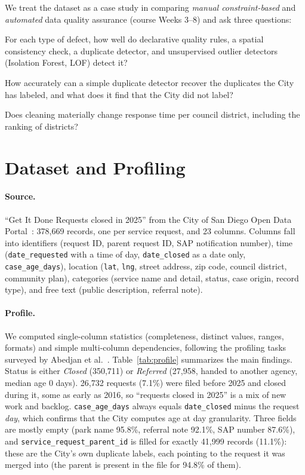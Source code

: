 \documentclass[11pt]{article}
\begin{document}
We treat the dataset as a case study in comparing \emph{manual constraint-based} and \emph{automated} data quality assurance (course Weeks 3--8) and ask three questions:

\begin{description}[leftmargin=1.2cm, style=nextline]
  \item[RQ1] For each type of defect, how well do declarative quality rules, a spatial consistency check, a duplicate detector, and unsupervised outlier detectors (Isolation Forest, LOF) detect it?
  \item[RQ2] How accurately can a simple duplicate detector recover the duplicates the City has labeled, and what does it find that the City did not label?
  \item[RQ3] Does cleaning materially change response time per council district, including the ranking of districts?
\end{description}

\section{Dataset and Profiling}

\paragraph{Source.} ``Get It Done Requests closed in 2025'' from the City of San Diego Open Data Portal~\cite{sdopendata}: 378,669 records, one per service request, and 23 columns. Columns fall into identifiers (request ID, parent request ID, SAP notification number), time (\texttt{date\_requested} with a time of day, \texttt{date\_closed} as a date only, \texttt{case\_age\_days}), location (\texttt{lat}, \texttt{lng}, street address, zip code, council district, community plan), categories (service name and detail, status, case origin, record type), and free text (public description, referral note).

\paragraph{Profile.} We computed single-column statistics (completeness, distinct values, ranges, formats) and simple multi-column dependencies, following the profiling tasks surveyed by Abedjan et al.~\cite{abedjan2015profiling}. Table~\ref{tab:profile} summarizes the main findings. Status is either \emph{Closed} (350,711) or \emph{Referred} (27,958, handed to another agency, median age 0 days). 26,732 requests (7.1\%) were filed before 2025 and closed during it, some as early as 2016, so ``requests closed in 2025'' is a mix of new work and backlog. \texttt{case\_age\_days} always equals \texttt{date\_closed} minus the request \emph{day}, which confirms that the City computes age at day granularity. Three fields are mostly empty (park name 95.8\%, referral note 92.1\%, SAP number 87.6\%), and \texttt{service\_request\_parent\_id} is filled for exactly 41,999 records (11.1\%): these are the City's own duplicate labels, each pointing to the request it was merged into (the parent is present in the file for 94.8\% of them).
\end{document}
